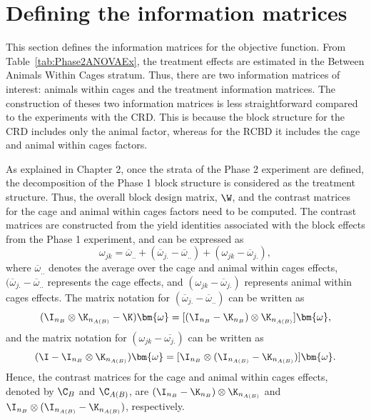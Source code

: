 \section{Defining the information matrices}
\label{sec:infoMatChap4}
This section defines the information matrices for the objective function. From Table~\ref{tab:Phase2ANOVAEx}, the treatment effects are estimated in the Between Animals Within Cages stratum. Thus, there are two information matrices of interest: animals within cages and the treatment information matrices. The construction of theses two information matrices is less straightforward compared to the experiments with the CRD. This is because the block structure for the CRD includes only the animal factor, whereas for the RCBD it includes the cage and animal within cages factors. 

As explained in Chapter 2, once the strata of the Phase 2 experiment are defined, the decomposition of the Phase 1 block structure is considered as the treatment structure. Thus, the overall block design matrix, $\W$, and the contrast matrices for the cage and animal within cages factors need to be computed. The contrast matrices are constructed from the yield identities associated with the block effects from the Phase 1 experiment, and can be expressed as 
\[
\omega_{jk} = \overline{\omega}_{..}+(\overline{\omega}_{j.} - \overline{\omega}_{..}) + (\omega_{jk} - \overline{\omega}_{j.}),
\]
where $\overline{\omega}_{..}$ denotes the average over the cage and animal within cages effects, $(\overline{\omega}_{j.} - \overline{\omega}_{..}$ represents the cage effects, and $(\omega_{jk} - \overline{\omega}_{j.})$ represents animal within cages effects. The matrix notation for $(\overline{\omega}_{j.} - \overline{\omega}_{..})$
can be written as 
\[( \I_{n_B} \otimes \K_{n_{A(B)}} - \K)\bm{\omega} = [(\I_{n_B} -  \K_{n_B}) \otimes \K_{n_{A(B)}}]\bm{\omega},\]
and the matrix notation for $(\omega_{jk} - \overline{\omega_{j.}})$ can be written as 
\[( \I - \I_{n_B} \otimes \K_{n_{A(B)}})\bm{\omega} = [\I_{n_B} \otimes (\I_{n_{A(B)}} -\K_{n_{A(B)}})]\bm{\omega}.\]
Hence, the contrast matrices for the cage and animal within cages effects, denoted by $\C_B$ and $\C_{A(B)}$, are $(\I_{n_B} -  \K_{n_B}) \otimes \K_{n_{A(B)}}$ and $\I_{n_B} \otimes (\I_{n_{A(B)}} - \K_{n_{A(B)}})$, respectively.

